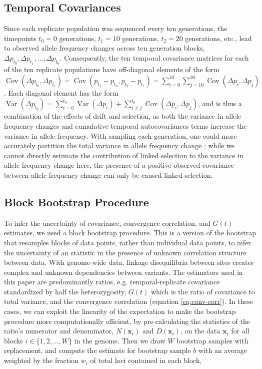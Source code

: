 \documentclass[11pt]{article}
\DeclareMathOperator{\var}{Var}
\DeclareMathOperator{\cov}{Cov}
\begin{document}
\subsection{\textcite{Barghi2019-qy} Temporal Covariances}
\label{supp:barghi-covs}

Since each replicate population was sequenced every ten generations,
the timepoints $t_0 = 0$ generations, $t_1 = 10$ generations, $t_2 = 20$
generations, etc., lead to observed allele frequency changes across ten
generation blocks, $\Delta p_{t_0}, \Delta p_{t_1}, \ldots, \Delta p_{t_6}$.
Consequently, the ten temporal covariance matrices for each of the ten
replicate populations have off-diagonal elements of the form $\cov(\Delta
p_{t_0}, \Delta p_{t_1}) = \cov(p_{t_1} - p_{t_0}, p_{t_2} - p_{t_1}) =
\sum_{i=0}^{10} \sum_{j=10}^{20} \cov(\Delta p_i, \Delta p_j)$. Each diagonal
element has the form $\var(\Delta p_{t_0}) = \sum_{i=0}^{t_0} \var(\Delta
p_{i}) + \sum_{i \ne j}^{t_0} \cov(\Delta p_{i}, \Delta p_{j})$, and is thus a
combination of the effects of drift and selection, as both the variance in
allele frequency changes and cumulative temporal autocovariances terms increase
the variance in allele frequency. With sampling each generation, one could more
accurately partition the total variance in allele frequency change
\parencite{Buffalo2019-io}; while we cannot directly estimate the contribution
of linked selection to the variance in allele frequency change here, the
presence of a positive observed covariance between allele frequency change can
only be caused linked selection. 

\subsection{Block Bootstrap Procedure}
\label{supp:block-bootstrap}


To infer the uncertainty of covariance, convergence correlation, and $G(t)$
estimates, we used a block bootstrap procedure. This is a version of the
bootstrap that resamples blocks of data points, rather than individual data
points, to infer the uncertainty of an statistic in the presence of unknown
correlation structure between data. With genome-wide data, linkage
disequilibria between sites creates complex and unknown dependencies between
variants. The estimators used in this paper are predominantly ratios, e.g.
temporal-replicate covariance standardized by half the heterozygosity, $G(t)$
which is the ratio of covariance to total variance, and the convergence
correlation (equation \eqref{eq:conv-corr}). In these cases, we can exploit the
linearity of the expectation to make the bootstrap procedure more
computationally efficient, by pre-calculating the statistics of the ratio's
numerator and denominator, $N(\mathbf{x}_i)$ and $D(\mathbf{x}_i)$, on the data
$\mathbf{x}_i$ for all blocks $i \in \{1, 2, \ldots, W\}$ in the genome. Then
we draw $W$ bootstrap samples with replacement, and compute the estimate for
bootstrap sample $b$ with an average weighted by the fraction $w_i$ of total
loci contained in each block, 
\end{document}
